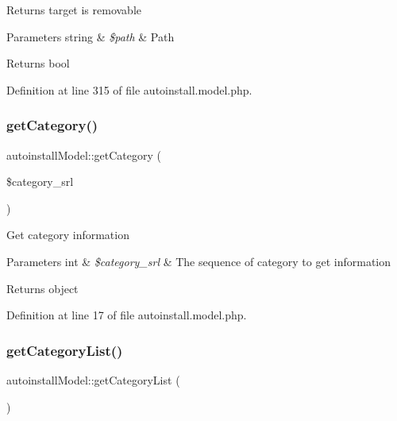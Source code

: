 Returns target is removable


\begin{DoxyParams}[1]{Parameters}
string & {\em \$path} & Path \\
\hline
\end{DoxyParams}
\begin{DoxyReturn}{Returns}
bool 
\end{DoxyReturn}


Definition at line 315 of file autoinstall.\+model.\+php.

\hypertarget{classautoinstallModel_a8f87ae860d59c5230baded7e25f38b96}{}\label{classautoinstallModel_a8f87ae860d59c5230baded7e25f38b96} 
\subsubsection{\texorpdfstring{get\+Category()}{getCategory()}}
{\footnotesize\ttfamily autoinstall\+Model\+::get\+Category (\begin{DoxyParamCaption}\item[{}]{\$category\+\_\+srl }\end{DoxyParamCaption})}

Get category information


\begin{DoxyParams}[1]{Parameters}
int & {\em \$category\+\_\+srl} & The sequence of category to get information \\
\hline
\end{DoxyParams}
\begin{DoxyReturn}{Returns}
object 
\end{DoxyReturn}


Definition at line 17 of file autoinstall.\+model.\+php.

\hypertarget{classautoinstallModel_a64deb99bf9367124115928a6faa12933}{}\label{classautoinstallModel_a64deb99bf9367124115928a6faa12933} 
\subsubsection{\texorpdfstring{get\+Category\+List()}{getCategoryList()}}
{\footnotesize\ttfamily autoinstall\+Model\+::get\+Category\+List (\begin{DoxyParamCaption}{ }\end{DoxyParamCaption})}


